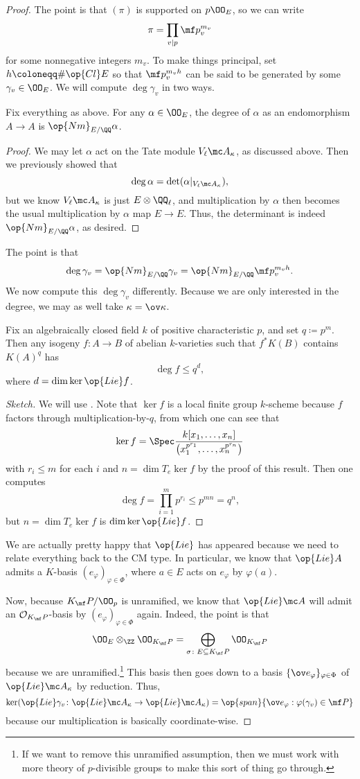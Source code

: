 \documentclass[../notes.tex]{subfiles}
\begin{document}
\begin{proof}
	The point is that $(\pi)$ is supported on $p\OO_E$, so we can write
	\[\pi=\prod_{v\mid p}\mf p_v^{m_v}\]
	for some nonnegative integers $m_v$. To make things principal, set $h\coloneqq\#\op{Cl}E$ so that $\mf p_v^{m_vh}$ can be said to be generated by some $\gamma_v\in\OO_E$. We will compute $\deg\gamma_v$ in two ways.
	\begin{lemma}
		Fix everything as above. For any $\alpha\in\OO_E$, the degree of $\alpha$ as an endomorphism $A\to A$ is $\op{Nm}_{E/\QQ}\alpha$.
	\end{lemma}
	\begin{proof}
		We may let $\alpha$ act on the Tate module $V_\ell\mc A_\kappa$, as discussed above. Then we previously showed that
		\[\deg\alpha=\det(\alpha|_{V_\ell\mc A_\kappa}),\]
		but we know $V_\ell\mc A_\kappa$ is just $E\otimes\QQ_\ell$, and multiplication by $\alpha$ then becomes the usual multiplication by $\alpha$ map $E\to E$. Thus, the determinant is indeed $\op{Nm}_{E/\QQ}\alpha$, as desired.
	\end{proof}
	The point is that
	\[\deg\gamma_v=\op{Nm}_{E/\QQ}\gamma_v=\op{Nm}_{E/\QQ}\mf p_v^{m_vh}.\]
	We now compute this $\deg\gamma_v$ differently. Because we are only interested in the degree, we may as well take $\kappa=\ov\kappa$.
	\begin{lemma}
		Fix an algebraically closed field $k$ of positive characteristic $p$, and set $q\coloneqq p^m$. Then any isogeny $f\colon A\to B$ of abelian $k$-varieties such that $f^*K(B)$ contains $K(A)^q$ has
		\[\deg f\le q^d,\]
		where $d=\dim\ker\op{Lie}f$.
	\end{lemma}
	\begin{proof}[Sketch]
		We will use \cite[Theorem~11.27]{milne-alg-grp}. Note that $\ker f$ is a local finite group $k$-scheme because $f$ factors through multiplication-by-$q$, from which one can see that
		\[\ker f=\Spec\frac{k[x_1,\ldots,x_n]}{\left(x_1^{p^{r_1}},\ldots,x_n^{p^{r_n}}\right)}\]
		with $r_i\le m$ for each $i$ and $n=\dim T_e\ker f$ by the proof of this result. Then one computes
		\[\deg f=\prod_{i=1}^mp^{r_i}\le p^{mn}=q^n,\]
		but $n=\dim T_e\ker f$ is $\dim\ker\op{Lie}f$.
	\end{proof}
	We are actually pretty happy that $\op{Lie}$ has appeared because we need to relate everything back to the CM type. In particular, we know that $\op{Lie}A$ admits a $K$-basis $(e_\varphi)_{\varphi\in\Phi}$, where $a\in E$ acts on $e_\varphi$ by $\varphi(a)$.

	Now, because $K_\mf P/\OO_p$ is unramified, we know that $\op{Lie}\mc A$ will admit an $\mathcal O_{K_\mf P}$-basis by $(e_\varphi)_{\varphi\in\Phi}$ again. Indeed, the point is that
	\[\OO_E\otimes_\ZZ\OO_{K_\mf P}=\bigoplus_{\sigma\colon E\subseteq K_\mf P}\OO_{K_\mf P}\]
	because we are unramified.\footnote{If we want to remove this unramified assumption, then we must work with more theory of $p$-divisible groups to make this sort of thing go through.} This basis then goes down to a basis $\{\ov e_\varphi\}_{\varphi\in\Phi}$ of $\op{Lie}\mc A_\kappa$ by reduction. Thus,
	\[\ker(\op{Lie}\gamma_v\colon\op{Lie}\mc A_\kappa\to\op{Lie}\mc A_\kappa)=\op{span}\{\ov e_\varphi:\varphi(\gamma_v)\in\mf P\}\]
	because our multiplication is basically coordinate-wise.


\end{proof}
\end{document}
